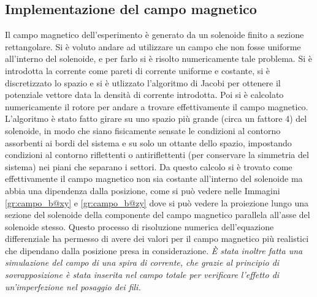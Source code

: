 \subsection{Implementazione del campo magnetico}
Il campo magnetico dell'esperimento è generato da un solenoide finito a sezione rettangolare. Si è voluto andare ad utilizzare un campo che non fosse uniforme all'interno
del solenoide, e per farlo si è risolto numericamente tale problema. Si è introdotta la corrente come pareti di corrente uniforme e costante, si è discretizzato lo spazio
e si è utlizzato l'algoritmo di Jacobi per ottenere il potenziale vettore data la densità di corrente introdotta. Poi si è calcolato numericamente il rotore per
andare a trovare effettivamente il campo magnetico. L'algoritmo è stato fatto girare su uno spazio più grande (circa un fattore 4) del solenoide, in modo che siano
fisicamente sensate le condizioni al contorno assorbenti ai bordi del sistema e su solo un ottante dello spazio, impostando condizioni al contorno riflettenti o antiriflettenti (per conservare la simmetria del sistema) nei piani che separano i settori. Da questo calcolo si è trovato come effettivamente il campo magnetico non sia costante
all'interno del solenoide ma abbia una dipendenza dalla posizione, come si può vedere nelle Immagini \ref{gr:campo_b@xy} e \ref{gr:campo_b@zy} dove si può vedere la proiezione lungo una
sezione del solenoide della componente del campo magnetico parallela all'asse del solenoide stesso. Questo processo di risoluzione numerica dell'equazione differenziale
ha permesso di avere dei valori per il campo magnetico più realistici che dipendano dalla posizione presa in considerazione.
\textit{\`E stata inoltre fatta una simulazione del campo di una spira di corrente, che grazie al principio di sovrapposizione \`e stata inserita nel campo totale per verificare l'effetto di un'imperfezione nel posaggio dei fili.}

